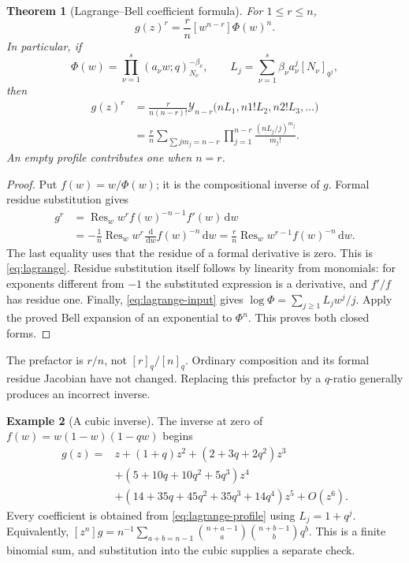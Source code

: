 \documentclass[11pt,a4paper]{article}
\numberwithin{equation}{section}
\newtheorem{theorem}{Theorem}[section]
\theoremstyle{definition}
\newtheorem{example}[theorem]{Example}
\theoremstyle{remark}
\newcommand{\coef}[2]{[#1^{#2}]}
\newcommand{\Res}{\operatorname{Res}}
\newcommand{\dd}{\,\mathrm d}
\newcommand{\Y}{\mathcal Y}
\begin{document}
\begin{theorem}[Lagrange--Bell coefficient formula]
For $1\le r\le n$,
\begin{equation}
 \coef zn g(z)^r=\frac rn\coef w{n-r}\Phi(w)^n.
 \label{eq:lagrange}
\end{equation}
In particular, if
\begin{equation}
 \Phi(w)=\prod_{\nu=1}^s(a_\nu w;q)_{N_\nu}^{-\beta_\nu},
 \qquad L_j=\sum_{\nu=1}^s\beta_\nu a_\nu^j[N_\nu]_{q^j},
 \label{eq:lagrange-input}
\end{equation}
then
\begin{align}
 \coef zn g(z)^r
 &=\frac{r}{n(n-r)!}
     \Y_{n-r}\bigl(nL_1,n1!L_2,n2!L_3,\ldots\bigr)
 \label{eq:lagrange-bell}\\
 &=\frac rn
    \sum_{\sum jm_j=n-r}\prod_{j=1}^{n-r}
            \frac{(nL_j/j)^{m_j}}{m_j!}.
 \label{eq:lagrange-profile}
\end{align}
An empty profile contributes one when $n=r$.
\end{theorem}
\begin{proof}
Put $f(w)=w/\Phi(w)$; it is the compositional inverse of $g$. Formal
residue substitution gives
\begin{align*}
 \coef zn g^r
 &=\Res_w w^rf(w)^{-n-1}f'(w)\dd w\\
 &=-\frac1n\Res_w w^r\frac{\dd}{\dd w}f(w)^{-n}\dd w
 =\frac rn\Res_w w^{r-1}f(w)^{-n}\dd w.
\end{align*}
The last equality uses that the residue of a formal derivative is zero.
This is \cref{eq:lagrange}. Residue substitution itself follows by
linearity from monomials: for exponents different from $-1$ the
substituted expression is a derivative, and $f'/f$ has residue one.
Finally, \cref{eq:lagrange-input} gives
$\log\Phi=\sum_{j\ge1}L_jw^j/j$. Apply the proved Bell expansion of an
exponential to $\Phi^n$. This proves both closed forms.
\end{proof}
The prefactor is $r/n$, not $[r]_q/[n]_q$. Ordinary composition and its
formal residue Jacobian have not changed. Replacing this prefactor by a
$q$-ratio generally produces an incorrect inverse.

\begin{example}[A cubic inverse]
The inverse at zero of $f(w)=w(1-w)(1-qw)$ begins
\begin{align*}
 g(z)={}&z+(1+q)z^2+(2+3q+2q^2)z^3\\
 &+(5+10q+10q^2+5q^3)z^4\\
 &+(14+35q+45q^2+35q^3+14q^4)z^5+O(z^6).
\end{align*}
Every coefficient is obtained from \cref{eq:lagrange-profile} using
$L_j=1+q^j$. Equivalently,
$\coef zn g=n^{-1}\sum_{a+b=n-1}\binom{n+a-1}{a}
\binom{n+b-1}{b}q^b$. This is a finite binomial sum, and substitution
into the cubic supplies a separate check.
\end{example}
\end{document}
